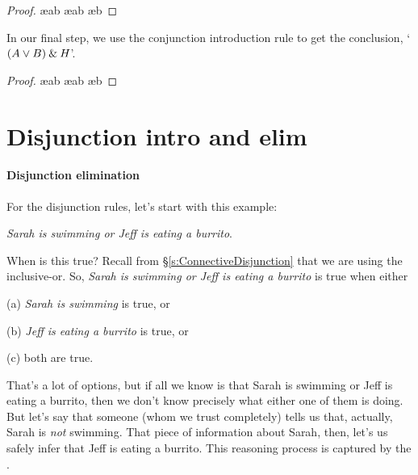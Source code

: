 \begin{proof}
	 \pr{}
	 \ae{ab}
	 \ae{ab}
	 \ae{b}
\end{proof}
In our final step, we use the conjunction introduction rule to get the conclusion, `$(A\vee B)\mathbin{\&} H$'.
\begin{proof}
	 \pr{}
	 \ae{ab}
	 \ae{ab}
	 \ae{b}
	 
\end{proof}
 

\section{Disjunction intro and elim}\label{s:disj-rule}


\paragraph{Disjunction elimination}
For the disjunction rules, let's start with this example: 
\begin{ebullet}
	\item[] \textit{Sarah is swimming or Jeff is eating a burrito}. 
\end{ebullet}
When is this true? Recall from \S \ref{s:ConnectiveDisjunction} that we are using the inclusive-or. So, \textit{Sarah is swimming or Jeff is eating a burrito} is true when either
\begin{ebullet}
	\item[(a)] \textit{Sarah is swimming} is true, or 
	\item[(b)] \textit{Jeff is eating a burrito} is true, or 
	\item[(c)] both are true. 
\end{ebullet}
That's a lot of options, but if all we know is that Sarah is swimming or Jeff is eating a burrito, then we don't know precisely what either one of them is doing. But let's say that someone (whom we trust completely) tells us that, actually, Sarah is \textit{not} swimming. That piece of information about Sarah, then, let's us safely infer that Jeff is eating a burrito. This reasoning process is captured by the .

